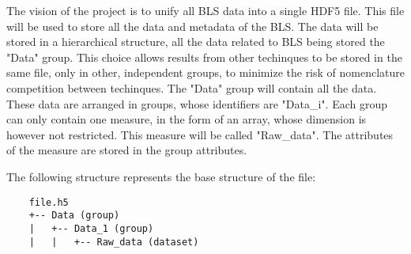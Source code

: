 The vision of the project is to unify all BLS data into a single HDF5 file. This file will be used to store all the data and metadata of the BLS. The data will be stored in a hierarchical structure, all the data related to BLS being stored the "Data" group. This choice allows results from other techinques to be stored in the same file, only in other, independent groups, to minimize the risk of nomenclature competition between techinques. The "Data" group will contain all the data. These data are arranged in groups, whose identifiers are "Data\_i". Each group can only contain one measure, in the form of an array, whose dimension is however not restricted. This measure will be called "Raw\_data". The attributes of the measure are stored in the group attributes.

The following structure represents the base structure of the file:

\begin{verbatim}
    file.h5
    +-- Data (group)
    |   +-- Data_1 (group)
    |   |   +-- Raw_data (dataset)
\end{verbatim}
